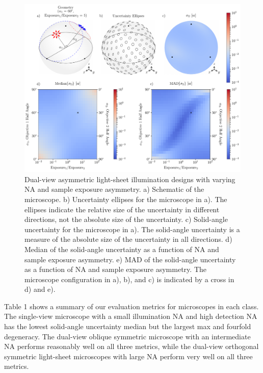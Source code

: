\documentclass[10pt]{article}
\begin{document}
\begin{figure}[htbp]
  \centering\includegraphics[width=\textwidth]{asymmetric-double}
  \caption{Dual-view asymmetric light-sheet illumination designs with varying NA
    and sample exposure asymmetry. a) Schematic of the microscope. b)
    Uncertainty ellipses for the microscope in a). The ellipses indicate the
    relative size of the uncertainty in different directions, not the absolute
    size of the uncertainty. c) Solid-angle uncertainty for the microscope in
    a). The solid-angle uncertainty is a measure of the absolute size of the
    uncertainty in all directions. d) Median of the solid-angle uncertainty as a
    function of NA and sample exposure asymmetry. e) MAD of the solid-angle
    uncertainty as a function of NA and sample exposure asymmetry. The
    microscope configuration in a), b), and c) is indicated by a cross in d) and e).}
\label{fig:asymmetric-double}
\end{figure}

Table 1 shows a summary of our evaluation metrics for microscopes in each
class. The single-view microscope with a small illumination NA and high
detection NA has the lowest solid-angle uncertainty median but the largest max
and fourfold degeneracy. The dual-view oblique symmetric microscope with an
intermediate NA performs reasonably well on all three metrics, while the
dual-view orthogonal symmetric light-sheet microscopes with large NA perform
very well on all three metrics.
\end{document}
